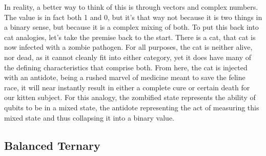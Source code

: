 \documentclass[a4paper]{article}
\begin{document}
 \newline
 In reality, a better way to think of this is through vectors and complex numbers.  The value is in fact both 1 and 0, but it's that way not because it is two things in a binary sense, but because it is a complex mixing of both.  To put this back into cat analogies, let's take the premise back to the start.  There is a cat, that cat is now infected with a zombie pathogen.  For all purposes, the cat is neither alive, nor dead, as it cannot cleanly fit into either category, yet it does have many of the defining characteristics that comprise both.  From here, the cat is injected with an antidote,  being a rushed marvel of medicine meant to save the feline race, it will near instantly result in either a complete cure or certain death for our kitten subject.  For this analogy, the zombified state represents the ability of qubits to be in a mixed state, the antidote representing the act of measuring this mixed state and thus collapsing it into a binary value. %


\subsection{Balanced Ternary} %
\end{document}
